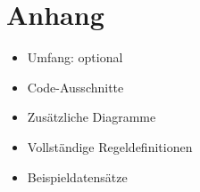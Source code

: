 \section{Anhang}
\begin{itemize}
    \item Umfang: optional
    \item Code-Ausschnitte
    \item Zusätzliche Diagramme
    \item Vollständige Regeldefinitionen
    \item Beispieldatensätze
\end{itemize}